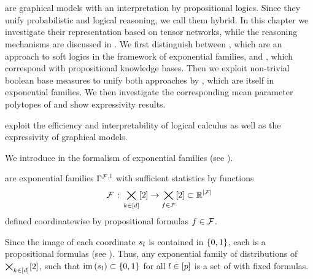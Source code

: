 \chapter{\chatextnetworkRepresentation}\label{cha:networkRepresentation}

\HybridLogicNetworks{} are graphical models with an interpretation by propositional logics.
Since they unify probabilistic and logical reasoning, we call them hybrid.
In this chapter we investigate their representation based on tensor networks, while the reasoning mechanisms are discussed in .
We first distinguish between \MarkovLogicNetworks{}, which are an approach to soft logics in the framework of exponential families, and \HardLogicNetworks{}, which correspond with propositional knowledge bases.
Then we exploit non-trivial boolean base measures to unify both approaches by \HybridLogicNetworks{}, which are itself in exponential families.
We then investigate the corresponding mean parameter polytopes of \HybridLogicNetworks{} and show expressivity results.

\sect{\MarkovLogicNetworks{}}

\MarkovLogicNetworks{} exploit the efficiency and interpretability of logical calculus as well as the expressivity of graphical models.


We introduce \MarkovLogicNetworks{} in the formalism of exponential families (see ).

\begin{definition}[\MarkovLogicNetwork]
    \label{def:mln}
    \MarkovLogicNetworks{} are exponential families $\Gamma^{\mathcal{F},\mathbb{I}}$ with sufficient statistics by functions
    \begin{align*}
        \mathcal{F} \,:\,\bigtimes_{k\in[d]}[2] \rightarrow \bigtimes_{f\in\mathcal{F}}[2] \subset \mathbb{R}^{\left|\mathcal{F}\right|}
    \end{align*}
    defined coordinatewise by propositional formulas $f\in\mathcal{F}$.
\end{definition}

Since the image of each coordinate $s_{l}$ is contained in $\{0,1\}$, each is a propositional formulas (see ).
Thus, any exponential family of distributions of $\bigtimes_{k\in[d]}[2]$, such that $\mathrm{im}\left(s_{l}\right)\subset\{0,1\}$ for all $l\in[p]$ is a set of \MarkovLogicNetworks{} with fixed formulas.


